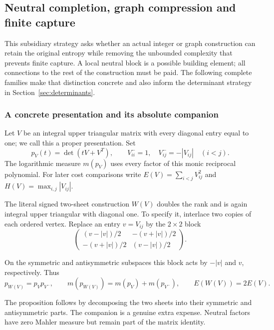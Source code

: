 \subsection{Neutral completion, graph compression and finite capture}
\label{sec:structures}

This subsidiary strategy asks whether an actual integer or graph construction can retain the original entropy while removing the unbounded complexity that prevents finite capture.
A local neutral block is a possible building element; all connections to the rest of the construction must be paid.
The following complete families make that distinction concrete and also inform the determinant strategy in Section~\ref{sec:determinants}.

\subsubsection{A concrete presentation and its absolute companion}
\label{str:conventions}

\begin{definition}\label{str:proper-presentation}
Let $V$ be an integral upper triangular matrix with every diagonal entry equal to one; we call this a proper presentation.
Set
\[
 p_V(t)=\det(tV+V^T),\qquad
 V^-_{ii}=1,\quad V^-_{ij}=-|V_{ij}|\quad(i<j).
\]
The logarithmic measure $m(p_V)$ uses every factor of this monic reciprocal polynomial.
For later cost comparisons write $E(V)=\sum_{i<j}V_{ij}^2$ and $H(V)=\max_{i,j}|V_{ij}|$.
\end{definition}
The literal signed two-sheet construction $W(V)$ doubles the rank and is again integral upper triangular with diagonal one.
To specify it, interlace two copies of each ordered vertex.
Replace an entry $v=V_{ij}$ by the $2\times2$ block
\[
 \begin{pmatrix}(v-|v|)/2&-(v+|v|)/2\\
                 -(v+|v|)/2&(v-|v|)/2\end{pmatrix}.
\]
\begin{proposition}\label{str:signed-cover}
On the symmetric and antisymmetric subspaces this block acts by $-|v|$ and $v$, respectively.
Thus
\begin{equation}\label{str:cover}
 p_{W(V)}=p_Vp_{V^-},\qquad
 m(p_{W(V)})=m(p_V)+m(p_{V^-}),\qquad E(W(V))=2E(V).
\end{equation}
\end{proposition}
The proposition follows by decomposing the two sheets into their symmetric and antisymmetric parts.
The companion is a genuine extra expense.
Neutral factors have zero Mahler measure but remain part of the matrix identity.

